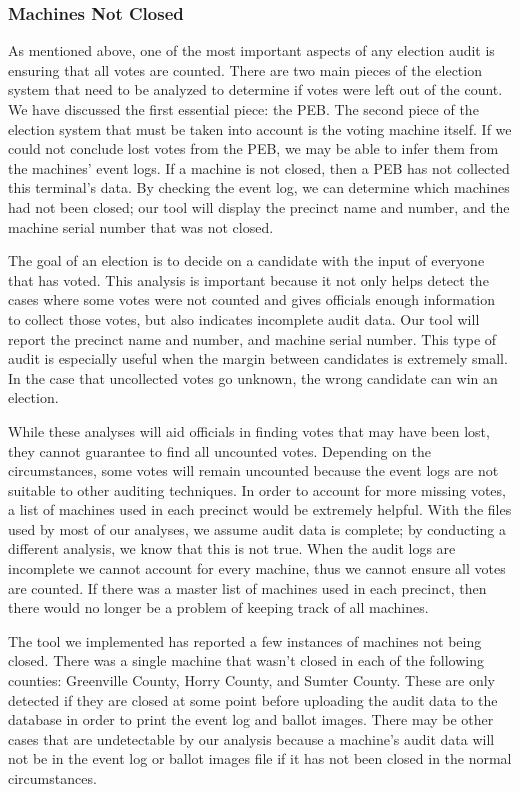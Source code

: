 \subsubsection{Machines Not Closed}
As mentioned above, one of the most important aspects of any election audit is ensuring that all votes are counted.  There are two main pieces of the election system that need to be analyzed to determine if votes were left out of the count.  We have discussed the first essential piece: the PEB.  The second piece of the election system that must be taken into account is the voting machine itself.  If we could not conclude lost votes from the PEB, we may be able to infer them from the machines' event logs.  If a machine is not closed, then a PEB has not collected this terminal's data.  By checking the event log, we can determine which machines had not been closed; our tool will display the precinct name and number, and the machine serial number that was not closed.  

The goal of an election is to decide on a candidate with the input of everyone that has voted.  This analysis is important because it not only helps detect the cases where some votes were not counted and gives officials enough information to collect those votes, but also indicates incomplete audit data.  Our tool will report the precinct name and number, and machine serial number.  This type of audit is especially useful when the margin between candidates is extremely small.  In the case that uncollected votes go unknown, the wrong candidate can win an election.  	

While these analyses will aid officials in finding votes that may have been lost, they cannot guarantee to find all uncounted votes.  Depending on the circumstances, some votes will remain uncounted because the event logs are not suitable to other auditing techniques.  In order to account for more missing votes, a list of machines used in each precinct would be extremely helpful.  With the files used by most of our analyses, we assume audit data is complete; by conducting a different analysis, we know that this is not true.  When the audit logs are incomplete we cannot account for every machine, thus we cannot ensure all votes are counted.  If there was a master list of machines used in each precinct, then there would no longer be a problem of keeping track of all machines.  

The tool we implemented has reported a few instances of machines not being closed.  There was a single machine that wasn't closed in each of the following counties: Greenville County, Horry County, and Sumter County.  These are only detected if they are closed at some point before uploading the audit data to the database in order to print the event log and ballot images.  There may be other cases that are undetectable by our analysis because a machine's audit data will not be in the event log or ballot images file if it has not been closed in the normal circumstances. 

